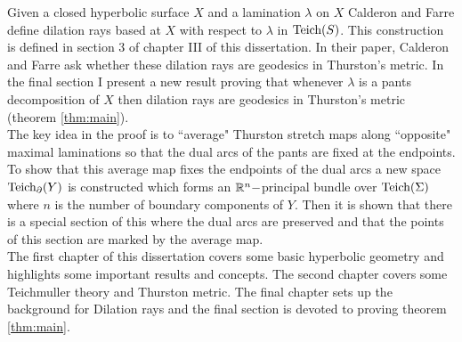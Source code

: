 Given a closed hyperbolic surface $X$ and a lamination $\lambda$ on $X$ Calderon and Farre define dilation rays based at $X$ with respect to $\lambda$ in $\text{Teich}(S)$. This construction is defined in section 3 of chapter III of this dissertation. In their paper, Calderon and Farre ask whether these dilation rays are geodesics in Thurston's metric. In the final section I present a new result proving that whenever $\lambda$ is a pants decomposition of $X$ then dilation rays are geodesics in Thurston's metric (theorem \ref{thm:main}).\\

The key idea in the proof is to ``average" Thurston stretch maps along ``opposite" maximal laminations so that the dual arcs of the pants are fixed at the endpoints. To show that this average map fixes the endpoints of the dual arcs a new space $\text{Teich}_\partial(Y)$ is constructed which forms an $\mathbb{R}^n-$principal bundle over $\text{Teich}(\Sigma)$ where $n$ is the number of boundary components of $Y$. Then it is shown that there is a special section of this where the dual arcs are preserved and that the points of this section are marked by the average map.\\

The first chapter of this dissertation covers some basic hyperbolic geometry and highlights some important results and concepts. The second chapter covers some Teichmuller theory and Thurston metric. The final chapter sets up the background for Dilation rays and the final section is devoted to proving theorem \ref{thm:main}.
